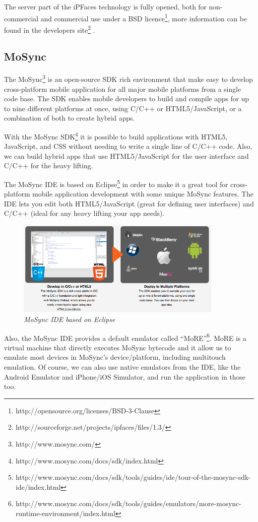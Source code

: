 \documentclass[a4paper,12pt]{book}
\begin{document}
The server part of the iPFaces technology is fully opened, both for non-commercial and commercial use under a BSD licence\footnote{http://opensource.org/licenses/BSD-3-Clause}, more information can be found in the developers site\footnote{http://sourceforge.net/projects/ipfaces/files/1.3/} .

\subsection{MoSync}
\label{MoSync} 

The MoSync\footnote{http://www.mosync.com/} is an open-source SDK rich environment that make easy to develop cross-platform mobile application for all major mobile platforms from a single code base. The SDK enables mobile developers to build and compile apps for up to nine different platforms at once, using C/C++ or HTML5/JavaScript, or a combination of both to create hybrid apps.

With the MoSync SDK\footnote{http://www.mosync.com/docs/sdk/index.html} it is possible to build applications with HTML5, JavaScript, and CSS without needing to write a single line of C/C++ code. Also, we can build hybrid apps that use HTML5/JavaScript for the user interface and C/C++ for the heavy lifting. 

The MoSync IDE is based on Eclipse\footnote{http://www.mosync.com/docs/sdk/tools/guides/ide/tour-of-the-mosync-sdk-ide/index.html} in order to make it a great tool for cross-platform mobile application development with some unique MoSync features. The IDE lets you edit both HTML5/JavaScript (great for defining user interfaces) and C/C++ (ideal for any heavy lifting your app needs).

\begin{figure}[H]
    \centering
    \includegraphics[width=10cm, keepaspectratio]{img/mosync.png}
    \caption{\textit{MoSync IDE based on Eclipse}}
 \end{figure}
 
Also, the MoSync IDE provides a default emulator called  “MoRE”\footnote{http://www.mosync.com/docs/sdk/tools/guides/emulators/more-mosync-runtime-environment/index.html}. MoRE is a  virtual machine that directly executes MoSync bytecode and  it allow us to emulate most devices in MoSync's device/platform, including  multitouch emulation. Of course, we can also use native emulators from the IDE, like the Android Emulator and iPhone/iOS Simulator, and run the application in those too.
\end{document}
